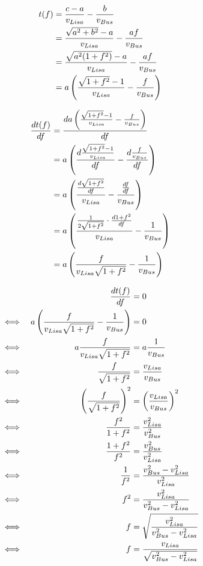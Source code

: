 \documentclass[12pt]{article}
\begin{document}
\begin{minipage}{0.45\textwidth}
\begin{align*}
t(f) &= \frac{c-a}{v_{Lisa}} - \frac{b}{v_{Bus}}\\
&= \frac{\sqrt{a^2+b^2}-a}{v_{Lisa}} - \frac{af}{v_{Bus}}\\
&= \frac{\sqrt{a^2(1+f^2)}-a}{v_{Lisa}} - \frac{af}{v_{Bus}}\\
&= a\left(\frac{\sqrt{1+f^2}-1}{v_{Lisa}} - \frac{f}{v_{Bus}}\right)\\
\end{align*}
\end{minipage}
\begin{minipage}{0.55\textwidth}
\begin{align*}
\frac{dt(f)}{df} &= \frac{da\left(\frac{\sqrt{1+f^2}-1}{v_{Lisa}} - \frac{f}{v_{Bus}}\right)}{df}\\
&= a\left(\frac{d\frac{\sqrt{1+f^2}-1}{v_{Lisa}}}{df} - \frac{d\frac{f}{v_{Bus}}}{df}\right)\\
&= a\left(\frac{\frac{d\sqrt{1+f^2}}{df}}{v_{Lisa}} - \frac{\frac{df}{df}}{v_{Bus}}\right)\\
&= a\left(\frac{\frac{1}{2\sqrt{1+f^2}}\cdot\frac{d1+f^2}{df}}{v_{Lisa}} - \frac{1}{v_{Bus}}\right)\\
&= a\left(\frac{f}{v_{Lisa}\sqrt{1+f^2}} - \frac{1}{v_{Bus}}\right)\\
\end{align*}
\end{minipage}

\begin{align*}
&&\frac{dt(f)}{df} &= 0\\
\iff&&a\left(\frac{f}{v_{Lisa}\sqrt{1+f^2}} - \frac{1}{v_{Bus}}\right) &= 0\\
\iff&&a\frac{f}{v_{Lisa}\sqrt{1+f^2}} &= a\frac{1}{v_{Bus}}\\
\iff&&\frac{f}{\sqrt{1+f^2}} &= \frac{v_{Lisa}}{v_{Bus}}\\
\iff&&\left(\frac{f}{\sqrt{1+f^2}}\right)^2 &= \left(\frac{v_{Lisa}}{v_{Bus}}\right)^2\\
\iff&&\frac{f^2}{1+f^2} &= \frac{v_{Lisa}^2}{v_{Bus}^2}\\
\iff&&\frac{1+f^2}{f^2} &= \frac{v_{Bus}^2}{v_{Lisa}^2}\\
\iff&&\frac{1}{f^2} &= \frac{v_{Bus}^2-v_{Lisa}^2}{v_{Lisa}^2}\\
\iff&&f^2 &= \frac{v_{Lisa}^2}{v_{Bus}^2-v_{Lisa}^2}\\
\iff&&f &= \sqrt{\frac{v_{Lisa}^2}{v_{Bus}^2-v_{Lisa}^2}}\\
\iff&&f &= \frac{v_{Lisa}}{\sqrt{v_{Bus}^2-v_{Lisa}^2}}\\
\end{align*}
\end{document}
